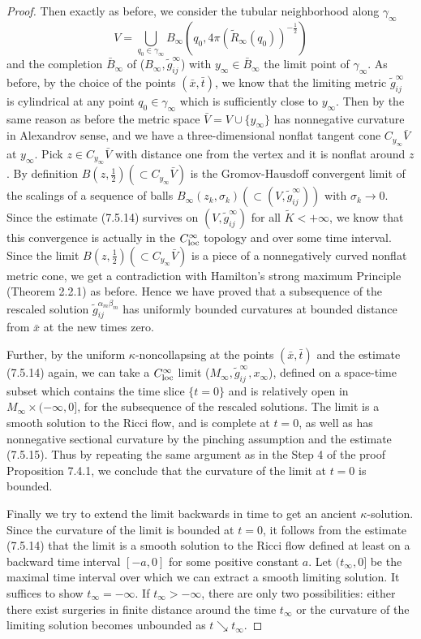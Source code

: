\begin{proof}
Then exactly as before, we consider the tubular neighborhood along
$\gamma_{\infty}$
$$
V=\bigcup_{q_0\in\gamma_{\infty}}B_{\infty}
(q_0,4\pi(\widetilde{R}_{\infty}(q_0))^{-\frac{1}{2}})
$$
and the completion $\bar{B}_{\infty}$ of
($B_{\infty},\widetilde{g}^{\infty}_{ij}$) with $y_{\infty}\in
\bar{B}_{\infty}$ the limit point of $\gamma_{\infty}$. As before,
by the choice of the points $(\bar{x},\bar{t})$, we know that the
limiting metric $\widetilde{g}^{\infty}_{ij}$ is cylindrical at
any point $q_0\in \gamma_{\infty}$ which is sufficiently close to
$y_{\infty}$. Then by the same reason as before the metric space
$\bar{V}=V\cup\{y_{\infty}\}$ has nonnegative curvature in
Alexandrov sense, and we have a three-dimensional nonflat tangent
cone $C_{y_{\infty}}\bar{V}$ at $y_{\infty}$. Pick $z\in
C_{y_{\infty}}\bar{V}$ with distance one from the vertex and it is
nonflat around $z$. By definition $B(z,\frac{1}{2}) (\subset
C_{y_{\infty}}\bar{V})$ is the Gromov-Hausdoff convergent limit of
the scalings of a sequence of balls $B_{\infty}(z_k,\sigma_k)
(\subset(V,\widetilde{g}^{\infty}_{ij}))$ with
$\sigma_k\rightarrow0$. Since the estimate (7.5.14) survives on
$(V,\widetilde{g}^{\infty}_{ij})$ for all $\widetilde{K}<
+\infty$, we know that this convergence is actually in the
$C^{\infty}_{\rm loc}$ topology and over some time interval. Since
the limit $B(z,\frac{1}{2}) (\subset C_{y_{\infty}}\bar{V})$ is a
piece of a nonnegatively curved nonflat metric cone, we get a
contradiction with Hamilton's strong maximum Principle (Theorem
2.2.1) as before. Hence we have proved that a subsequence of the
rescaled solution $\widetilde{g}^{\alpha_m\beta_m}_{ij}$ has
uniformly bounded curvatures at bounded distance from $\bar{x}$ at
the new times zero.

Further, by the uniform $\kappa$-noncollapsing at the points
$(\bar{x},\bar{t})$ and the estimate (7.5.14) again, we can take a
$C^{\infty}_{\rm loc}$ limit
($M_{\infty},\widetilde{g}^{\infty}_{ij},x_{\infty}$), defined on
a space-time subset which contains the time slice $\{t=0\}$ and is
relatively open in $M_{\infty}\times(-\infty,0]$, for the
subsequence of the rescaled solutions. The limit is a smooth
solution to the Ricci flow, and is complete at $t=0$, as well as
has nonnegative sectional curvature by the pinching assumption and
the estimate (7.5.15). Thus by repeating the same argument as in
the Step 4 of the proof Proposition 7.4.1, we conclude that the
curvature of the limit at $t=0$ is bounded.

Finally we try to extend the limit backwards in time to get an
ancient $\kappa$-solution. Since the curvature of the limit is
bounded at $t=0$, it follows from the estimate (7.5.14) that the
limit is a smooth solution to the Ricci flow defined at least on a
backward time interval $[-a,0]$ for some positive constant $a$.
Let $(t_{\infty},0]$ be the maximal time interval over which we
can extract a smooth limiting solution. It suffices to show
$t_{\infty}=-\infty$. If $t_{\infty}>-\infty$, there are only two
possibilities: either there exist surgeries in finite distance
around the time $t_{\infty}$ or the curvature of the limiting
solution becomes unbounded as $t\searrow t_{\infty}$.


\end{proof}
